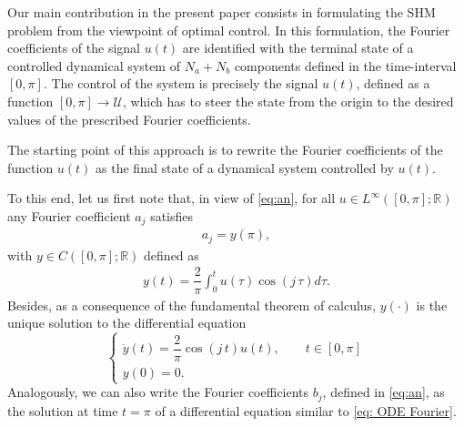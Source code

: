 \documentclass[twocolumn]{autart}    %
\begin{document}
Our main contribution in the present paper consists in formulating the SHM problem from the viewpoint of optimal control. In this formulation, the Fourier coefficients of the signal $u(t)$ are identified with the terminal state of a controlled dynamical system of $N_a+N_b$ components defined in the time-interval $[0,\pi]$.  The control of the system is precisely the signal $u(t)$, defined as a function $[0,\pi]\to \mathcal{U}$, which has to steer the state from the origin to the desired values of the prescribed Fourier coefficients. 

The starting point of this approach is to rewrite the Fourier coefficients of the function $u(t)$ as the final state of a dynamical system controlled by $u(t)$. 



To this end, let us first note that, in view of \eqref{eq:an}, for all $u\in L^\infty ([0,\pi];\mathbb{R})$ any Fourier coefficient $a_j$ satisfies
\begin{align*}
	a_j = y(\pi), 
\end{align*}
with $y\in C([0,\pi];\mathbb{R})$ defined as
\begin{align*}
	y(t) = \dfrac{2}{\pi} \int_0^t u(\tau) \cos(j\, \tau) d\tau.
\end{align*}
Besides, as a consequence of the fundamental theorem of calculus, $y(\cdot)$ is the unique solution to the differential equation
\begin{equation}\label{eq: ODE Fourier}
	\begin{cases}
		\dot{y} (t) = \dfrac{2}{\pi} \cos(j\, t) u(t), \qquad  t\in [0,\pi]
		\\[5pt]
		y(0) = 0.
	\end{cases}
\end{equation}
Analogously, we can also write the Fourier coefficients $b_j$, defined in \eqref{eq:an}, as the solution at time $t=\pi$ of a differential equation similar to \eqref{eq: ODE Fourier}.
\end{document}
